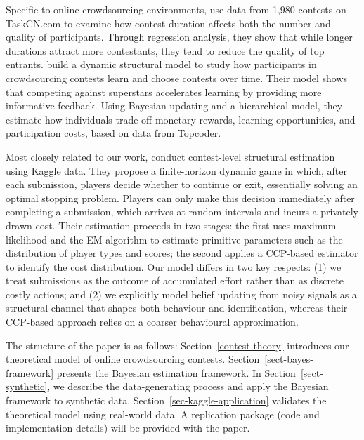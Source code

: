 \documentclass[mnsc]{informs3}
\begin{document}
Specific to online crowdsourcing environments,
\citet{chen2021attracting} use data from 1,980 contests on TaskCN.com to examine how contest duration affects both the number and quality of participants.
Through regression analysis, they show that while longer durations attract more contestants, they tend to reduce the quality of top entrants.
\citet{zhang2019structural} build a dynamic structural model to study how participants in crowdsourcing contests learn and choose contests over time.
Their model shows that competing against superstars accelerates learning by providing more informative feedback.
Using Bayesian updating and a hierarchical model, they estimate how individuals trade off monetary rewards, learning opportunities, and participation costs, based on data from Topcoder.

Most closely related to our work, \citet{lemus2021dynamic} conduct contest-level structural estimation using Kaggle data.
They propose a finite-horizon dynamic game in which, after each submission, players decide whether to continue or exit, essentially solving an optimal stopping problem.
Players can only make this decision immediately after completing a submission, which arrives at random intervals and incurs a privately drawn cost.
Their estimation proceeds in two stages: the first uses maximum likelihood and the EM algorithm to estimate primitive parameters such as the distribution of player types and scores; the second applies a CCP-based estimator to identify the cost distribution.
Our model differs in two key respects:
(1) we treat submissions as the outcome of accumulated effort rather than as discrete costly actions; and
(2) we explicitly model belief updating from noisy signals as a structural channel that shapes both behaviour and identification, whereas their CCP-based approach relies on a coarser behavioural approximation.







The structure of the paper is as follows:
Section~\ref{contest-theory} introduces our theoretical model of online crowdsourcing contests.
Section~\ref{sect-bayes-framework} presents the Bayesian estimation framework.
In Section~\ref{sect-synthetic}, we describe the data-generating process and apply the Bayesian framework to synthetic data.
Section~\ref{sec-kaggle-application} validates the theoretical model using real-world data.
A replication package (code and implementation details) will be provided with the paper.
\end{document}
